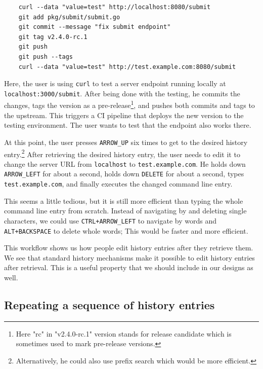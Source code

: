 \begin{verbatim}
    curl --data "value=test" http://localhost:8080/submit
    git add pkg/submit/submit.go
    git commit --message "fix submit endpoint"
    git tag v2.4.0-rc.1
    git push
    git push --tags
    curl --data "value=test" http://test.example.com:8080/submit
\end{verbatim}


Here, the user is using \verb|curl| to test a server endpoint running locally at \verb|localhost:3000/submit|. After being done with the testing, he commits the changes, tags the version as a pre-release\footnote{Here "rc" in "v2.4.0-rc.1" version stands for release candidate which is sometimes used to mark pre-release versions.}, and pushes both commits and tags to the upstream. This triggers a CI pipeline that deploys the new version to the testing environment. The user wants to test that the endpoint also works there.

At this point, the user presses \verb|ARROW_UP| six times to get to the desired history entry.\footnote{Alternatively, he could also use prefix search which would be more efficient.} 
After retrieving the desired history entry, the user needs to edit it to change the server URL from \verb|localhost| to \verb|test.example.com|. He holds down \verb|ARROW_LEFT| for about a second, holds down \verb|DELETE| for about a second, types \verb|test.example.com|, and finally executes the changed command line entry. 

This seems a little tedious, but it is still more efficient than typing the whole command line entry from scratch. Instead of navigating by and deleting single characters, we could use \verb|CTRL+ARROW_LEFT| to navigate by words and \verb|ALT+BACKSPACE| to delete whole words; This would be faster and more efficient. %

This workflow shows us how people edit history entries after they retrieve them. We see that standard history mechanisms make it possible to edit history entries after retrieval. %
This is a useful property that we should include in our designs as well. 

\subsection{Repeating a sequence of history entries}\label{workflow-repeating-a-sequence}

